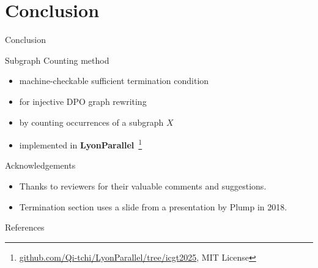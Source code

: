 \documentclass{beamer}
\begin{document}
\section{Conclusion}
\begin{frame}{Conclusion}

    Subgraph Counting method  
    \begin{itemize}
        \item machine-checkable sufficient termination condition
        \item for injective DPO graph rewriting
        \item by counting occurrences of a subgraph $X$
        \item implemented in \textbf{LyonParallel}~\footnote{\url{github.com/Qi-tchi/LyonParallel/tree/icgt2025}, MIT License}
    \end{itemize}





\end{frame}


\begin{frame}{Acknowledgements}
    \begin{itemize}
        \item Thanks to reviewers for their valuable comments and suggestions.
        \item Termination section uses a slide from a presentation by Plump in 2018.
    \end{itemize}
\end{frame}

\begin{frame}[allowframebreaks]{References}
    \printbibliography[heading=none]
\end{frame}
\end{document}
